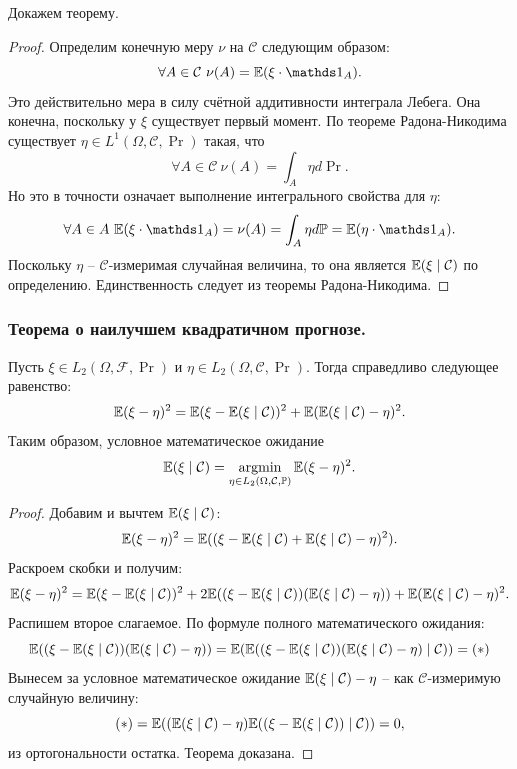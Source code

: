 Докажем теорему.
\begin{proof}
    Определим конечную меру $\nu$ на $\mathcal{C}$ следующим образом:
    \[
        \forall A \in \mathcal{C} \  \nu(A) = \Ex(\xi \cdot \Ind_{A}).
    \]
    Это действительно мера в силу счётной аддитивности интеграла Лебега.
    Она конечна, поскольку у $\xi$ существует первый момент. По теореме Радона-Никодима существует $\eta \in L^1(\Omega, \mathcal{C}, \Pr)$ такая, что 
    \[
        \forall A \in \mathcal{C} \ \nu(A) = \int_{A} \eta d\Pr.
    \]
    Но это в точности означает выполнение интегрального свойства для $\eta$:
    \[
        \forall A \in A \ \Ex(\xi \cdot \Ind_{A}) = \nu(A) = \int_{A} \eta d\Pr = \Ex(\eta \cdot \Ind_{A}).
    \]
    Поскольку $\eta$ -- $\mathcal{C}$-измеримая случайная величина, то она является $\mathbb{E}(\xi \mid \mathcal{C})$ по определению.
    Единственность следует из теоремы Радона-Никодима.
\end{proof}
\subsubsection{Теорема о наилучшем квадратичном прогнозе.}
\begin{theorem}
    Пусть $\xi \in L_2(\Omega, \mathcal{F}, \Pr)$ и $\eta \in L_2(\Omega, \mathcal{C}, \Pr)$. Тогда справедливо следующее равенство:
    \[
        \mathbb{E}(\xi - \eta)^2 = \mathbb{E}(\xi - \mathbb{E}(\xi \mid \mathcal{C}))^2 + \mathbb{E}(\mathbb{E}(\xi \mid \mathcal{C}) - \eta)^2.
    \]
    Таким образом, условное математическое ожидание 
    \[
        \mathbb{E}(\xi \mid \mathcal{C}) = \operatorname*{argmin}\limits_{\eta \in L_2(\Omega, \mathcal{C}, \mathbb{P})} \mathbb{E}(\xi - \eta)^2.
    \]
\end{theorem}
\begin{proof}
    Добавим и вычтем $\mathbb{E}(\xi \mid \mathcal{C})$:
    \[
        \mathbb{E}(\xi - \eta)^2 = \mathbb{E}((\xi - \mathbb{E}(\xi\mid \mathcal{C}) + \mathbb{E}(\xi \mid \mathcal{C}) - \eta)^2).
    \]
    Раскроем скобки и получим:
    \[
        \mathbb{E}(\xi - \eta)^2 = \mathbb{E}(\xi - \mathbb{E}(\xi \mid \mathcal{C}))^2 + 2 \mathbb{E}((\xi - \mathbb{E}(\xi \mid \mathcal{C}))(\mathbb{E}(\xi \mid \mathcal{C}) - \eta)) +  \mathbb{E}(\mathbb{E}(\xi \mid \mathcal{C}) - \eta)^2.
    \]
    Распишем второе слагаемое. По формуле полного математического ожидания:
    \[
        \mathbb{E}((\xi - \mathbb{E}(\xi \mid \mathcal{C}))(\mathbb{E}(\xi \mid \mathcal{C}) - \eta)) = \mathbb{E}(\mathbb{E}((\xi - \mathbb{E}(\xi \mid \mathcal{C}))(\mathbb{E}(\xi \mid \mathcal{C}) - \eta) \mid \mathcal{C})) = (*)
    \]
    Вынесем за условное математическое ожидание $\mathbb{E}(\xi \mid \mathcal{C}) - \eta$ -- как $\mathcal{C}$-измеримую случайную величину:
    \[
        (*) = \mathbb{E}((\mathbb{E}(\xi \mid \mathcal{C}) - \eta)\mathbb{E}((\xi - \mathbb{E}(\xi \mid \mathcal{C}))\mid \mathcal{C})) = 0,
    \]
    из ортогональности остатка. Теорема доказана.
\end{proof}